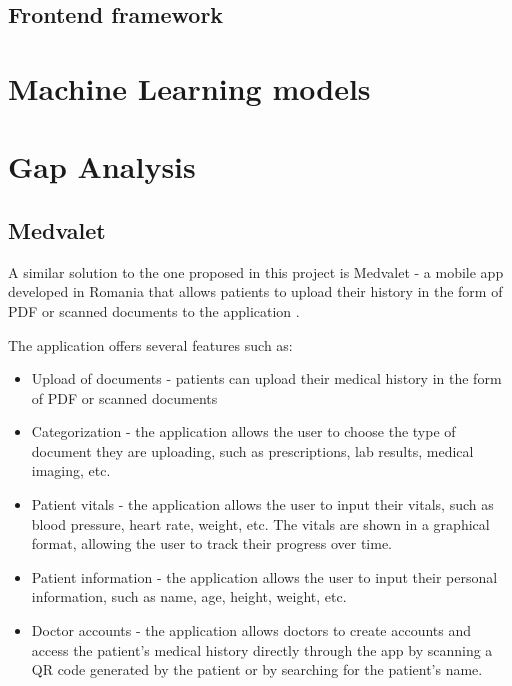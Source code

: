 \subsection{Frontend framework}

\section{Machine Learning models}

\section{Gap Analysis}

\subsection{Medvalet}

A similar solution to the one proposed in this project is Medvalet - a mobile app developed in Romania that allows patients to upload their history in the form of PDF or scanned documents to the application \parencite{medvalet}. 

The application offers several features such as:
\begin{itemize}
    \item Upload of documents - patients can upload their medical history in the form of PDF or scanned documents
    \item Categorization - the application allows the user to choose the type of document they are uploading, such as prescriptions, lab results, medical imaging, etc.
    \item Patient vitals - the application allows the user to input their vitals, such as blood pressure, heart rate, weight, etc. The vitals are shown in a graphical format, allowing the user to track their progress over time.
    \item Patient information - the application allows the user to input their personal information, such as name, age, height, weight, etc.
    \item Doctor accounts - the application allows doctors to create accounts and access the patient's medical history directly through the app by scanning a QR code generated by the patient or by searching for the patient's name.
\end{itemize}

